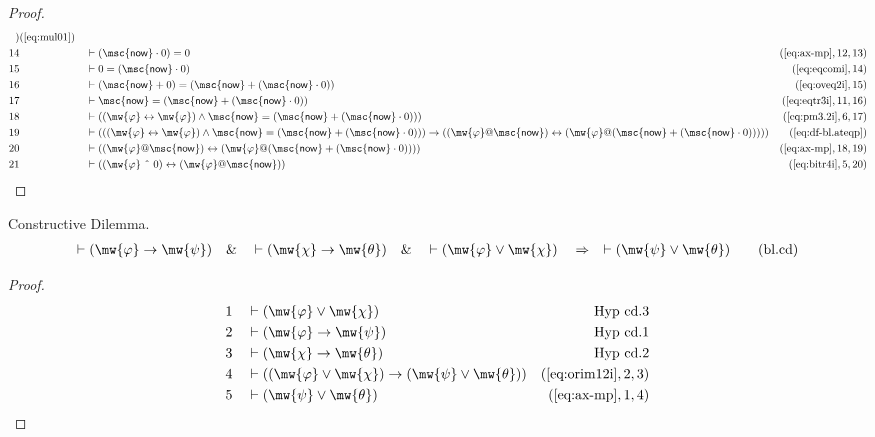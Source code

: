 \begin{proof}
\begin{align}
    )&(\mbox{\ref{eq:mul01}})\notag
  \\ 14 &&  & \vdash ( \mathsf{\msc{now}} \cdot 0 ) =
    0&(\mbox{\ref{eq:ax-mp}},12,13)\notag
  \\ 15 &&  & \vdash 0 = ( \mathsf{\msc{now}} \cdot 0
    )&(\mbox{\ref{eq:eqcomi}},14)\notag
  \\ 16 &&  & \vdash ( \mathsf{\msc{now}} + 0 ) = ( \mathsf{\msc{now}} + (
    \mathsf{\msc{now}} \cdot 0 )
    )&(\mbox{\ref{eq:oveq2i}},15)\notag
  \\ 17 &&  & \vdash \mathsf{\msc{now}} = ( \mathsf{\msc{now}} + (
    \mathsf{\msc{now}} \cdot 0 )
    )&(\mbox{\ref{eq:eqtr3i}},11,16)\notag
  \\ 18 &&  & \vdash ( ( \mw{\varphi} \leftrightarrow \mw{\varphi} ) \wedge
    \mathsf{\msc{now}} = ( \mathsf{\msc{now}} + (
    \mathsf{\msc{now}} \cdot 0 ) )
    )&(\mbox{\ref{eq:pm3.2i}},6,17)\notag
  \\ 19 &&  & \vdash ( ( ( \mw{\varphi} \leftrightarrow \mw{\varphi} ) \wedge
    \mathsf{\msc{now}} = ( \mathsf{\msc{now}} + (
    \mathsf{\msc{now}} \cdot 0 ) ) ) \rightarrow 
       ( (
    \mw{\varphi} @ \mathsf{\msc{now}} ) \leftrightarrow (
    \mw{\varphi} @ ( \mathsf{\msc{now}} + (
    \mathsf{\msc{now}} \cdot 0 ) ) ) )
    )&(\mbox{\ref{eq:df-bl.ateqp}})\notag
  \\ 20 &&  & \vdash ( ( \mw{\varphi} @ \mathsf{\msc{now}} ) \leftrightarrow (
    \mw{\varphi} @ ( \mathsf{\msc{now}} + (
    \mathsf{\msc{now}} \cdot 0 ) ) )
    )&(\mbox{\ref{eq:ax-mp}},18,19)\notag
  \\ 21 &&  & \vdash ( ( \mw{\varphi} ~\string^~ 0 ) \leftrightarrow (
    \mw{\varphi} @ \mathsf{\msc{now}} )
    )&(\mbox{\ref{eq:bitr4i}},5,20)\notag
\end{align}
\end{proof}

\begin{lemma} {Constructive Dilemma.}
\begin{align}
\vdash ( \mw{\varphi} \rightarrow \mw{\psi} )\quad\&\quad \vdash ( \mw{\chi}
    \rightarrow \mw{\theta} )\quad\&\quad \vdash ( \mw{\varphi} \vee \mw{\chi}
    )\quad\Rightarrow\quad \vdash ( \mw{\psi} \vee \mw{\theta}
    )\label{eq:bl.cd}\tag{bl.cd}
\end{align}
\end{lemma}


\begin{proof}
\begin{align}
  1 &&  & \vdash ( \mw{\varphi} \vee \mw{\chi} )&\text{Hyp~cd.3}\notag%
  \\ 2 &&  & \vdash ( \mw{\varphi} \rightarrow \mw{\psi}
     )&\text{Hyp~cd.1}\notag%
  \\ 3 &&  & \vdash ( \mw{\chi} \rightarrow \mw{\theta}
     )&\text{Hyp~cd.2}\notag%
  \\ 4 &&  & \vdash ( ( \mw{\varphi} \vee \mw{\chi} ) \rightarrow ( \mw{\psi}
     \vee \mw{\theta} )
     )&(\mbox{\ref{eq:orim12i}},2,3)\notag
  \\ 5 &&  & \vdash ( \mw{\psi} \vee \mw{\theta}
     )&(\mbox{\ref{eq:ax-mp}},1,4)\notag
\end{align}
\end{proof}

